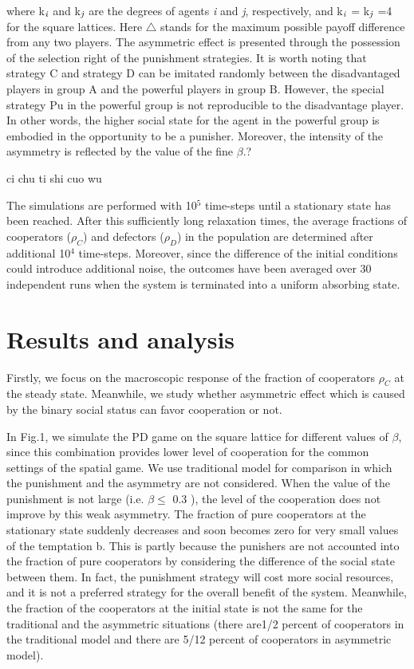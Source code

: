 \documentclass[%
 aip,
 amsmath,amssymb,
 reprint,%
]{revtex4-1}
\begin{document}
where k$_{\emph{i}}$ and k$_{\emph{j}}$ are the degrees of agents \emph{i} and \emph{j}, respectively, and k$_{\emph{i}}$ = k$_{\emph{j}}$ =4 for the square lattices. Here $\triangle$ stands for the maximum possible payoff difference from any two players. The asymmetric effect is presented through the possession of the selection right of the punishment strategies. It is worth noting that strategy C and strategy D can be imitated randomly between the disadvantaged players in group A and the powerful players in group B. However, the special strategy Pu in the powerful group is not reproducible to the disadvantage player. In other words, the higher social state for the agent in the powerful group is embodied in the opportunity to be a punisher. Moreover, the intensity of the asymmetry is reflected by the value of the fine $\beta$.?

ci chu ti shi cuo wu

The simulations are performed with 10$^{5}$ time-steps until a stationary state has been reached. After this sufficiently long relaxation times, the average fractions of cooperators ($\rho_C$) and defectors ($\rho_D$) in the population are determined after additional 10$^{4}$ time-steps. Moreover, since the difference of the initial conditions could introduce additional noise, the outcomes have been averaged over 30 independent runs when the system is terminated into a uniform absorbing state.


\section{\label{sec:level1}Results and analysis}

Firstly, we focus on the macroscopic response of the fraction of cooperators $\rho_C$ at the steady state. Meanwhile, we study whether asymmetric effect which is caused by the binary social status can favor cooperation or not.

In Fig.1, we simulate the PD game on the square lattice for different values of $\beta$, since this combination provides lower level of cooperation for the common settings of the spatial game. We use traditional model for comparison in which the punishment and the asymmetry are not considered. When the value of the punishment is not large (i.e. $\beta \leqslant$ 0.3 ), the level of the cooperation does not improve by this weak asymmetry. The fraction of pure cooperators at the stationary state suddenly decreases and soon becomes zero for very small values of the temptation b. This is partly because the punishers are not accounted into the fraction of pure cooperators by considering the difference of the social state between them. In fact, the punishment strategy will cost more social resources, and it is not a preferred strategy for the overall benefit of the system. Meanwhile, the fraction of the cooperators at the initial state is not the same for the traditional and the asymmetric situations (there are1/2 percent of cooperators in the traditional model and there are 5/12 percent of cooperators in asymmetric model).
\end{document}
